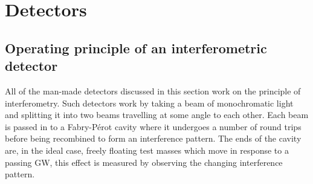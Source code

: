 \section{Detectors}\label{sec:detectors}
\subsection{Operating principle of an interferometric detector}\label{sec:principles}
All of the man-made detectors discussed in this section work on the principle of interferometry. Such detectors work by taking a beam of monochromatic light and splitting it into two beams travelling at some angle to each other. Each beam is passed in to a Fabry-P\'{e}rot cavity where it undergoes a number of round trips before being recombined to form an interference pattern. The ends of the cavity are, in the ideal case, freely floating test masses which move in response to a passing GW, this effect is measured by observing the changing interference pattern.

